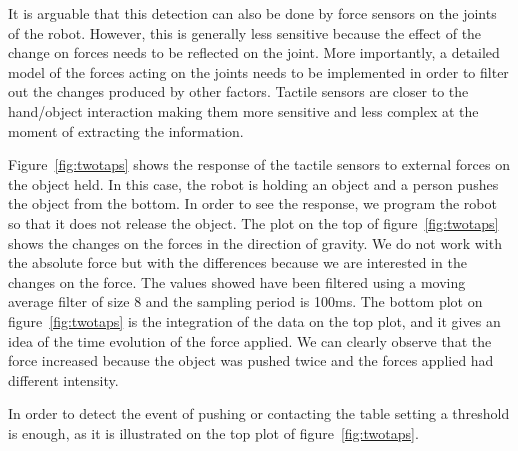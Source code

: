 It is arguable that this detection can also be done by force
sensors on the joints of the robot. However, this is generally
less sensitive because the effect of the change on forces needs to
be reflected on the joint. More importantly, a detailed model of
the forces acting on the joints needs to be implemented in order
to filter out the changes produced by other factors. Tactile
sensors are closer to the hand/object interaction making them more
sensitive and less complex at the moment of extracting the
information.

Figure~\ref{fig:twotaps} shows the response of the tactile sensors
to external forces on the object held. In this case, the robot is
holding an object and a person pushes the object from the bottom.
In order to see the response, we program the robot so that it does
not release the object. The plot on the top of
figure~\ref{fig:twotaps} shows the changes on the forces in the
direction of gravity.  We do not work with the absolute force but
with the differences because we are interested in the changes on
the force. The values showed have been filtered using a moving
average filter of size 8 and the sampling period is 100ms. The
bottom plot on figure~\ref{fig:twotaps} is the integration of the
data on the top plot, and it gives an idea of the time evolution
of the force applied. We can clearly observe that the force
increased because the object was pushed twice and the forces
applied had different intensity.

In order to detect the event of pushing or contacting the table
setting a threshold is enough, as it is illustrated on the top
plot of figure~\ref{fig:twotaps}.

